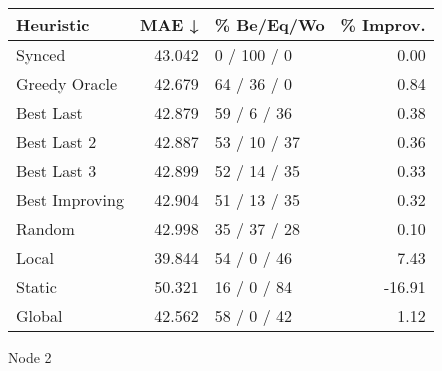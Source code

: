 \begin{tabular}{lrlr}
\toprule
\textbf{Heuristic} & \textbf{MAE ↓} & \textbf{\% Be/Eq/Wo} & \textbf{\% Improv.} \\
\midrule
            Synced &         43.042 &          0 / 100 / 0 &                0.00 \\
     Greedy Oracle &         42.679 &          64 / 36 / 0 &                0.84 \\
         Best Last &         42.879 &          59 / 6 / 36 &                0.38 \\
       Best Last 2 &         42.887 &         53 / 10 / 37 &                0.36 \\
       Best Last 3 &         42.899 &         52 / 14 / 35 &                0.33 \\
    Best Improving &         42.904 &         51 / 13 / 35 &                0.32 \\
            Random &         42.998 &         35 / 37 / 28 &                0.10 \\
             Local &         39.844 &          54 / 0 / 46 &                7.43 \\
            Static &         50.321 &          16 / 0 / 84 &              -16.91 \\
            Global &         42.562 &          58 / 0 / 42 &                1.12 \\
\bottomrule
\end{tabular}
\caption{Node 2}
\label{tab:iid_lr01_le2_bs4_2}
